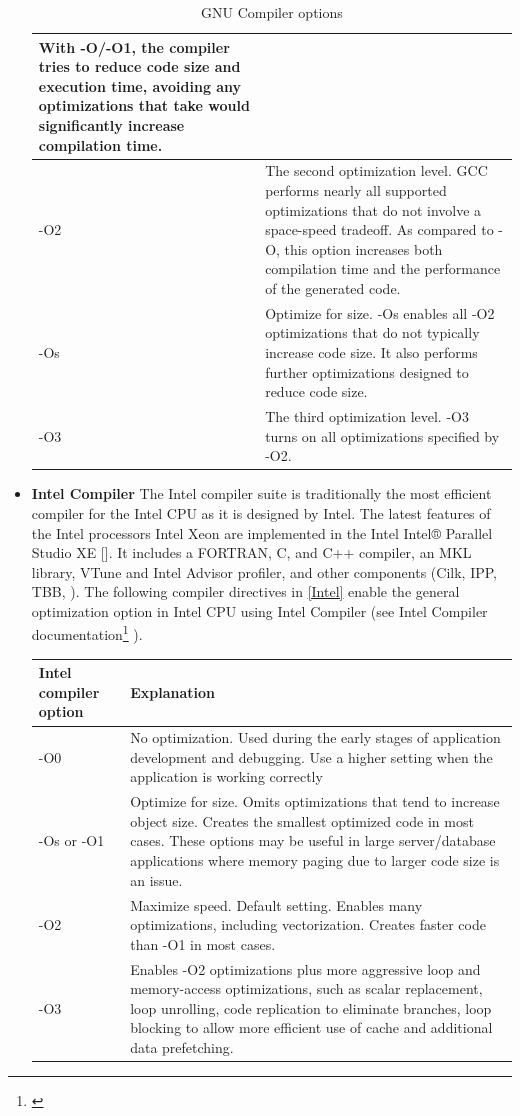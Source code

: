 \begin{itemize}
\begin{table}[!h]
\begin{tabularx}{\linewidth}{|X|X|}
With -O/-O1, the compiler tries to reduce code size and execution time, avoiding any optimizations that take would significantly increase compilation time. \\
\hline
-O2 &  The second optimization level. GCC performs nearly all supported optimizations that do not involve a space-speed tradeoff. As compared to -O, this option increases both compilation time and the performance of the generated code. \\
\hline
-Os & Optimize for size. -Os enables all -O2 optimizations that do not typically increase code size. It also performs further optimizations designed to reduce code size. \\
\hline
-O3 & The third optimization level. -O3 turns on all optimizations specified by -O2. \\
\hline
\end{tabularx}
\caption{\label{GCC} GNU Compiler options}
\end{table} 

\item \textbf{Intel Compiler}
The Intel compiler suite is traditionally the most efficient compiler for the Intel CPU as it is designed by Intel. The latest features of the Intel processors Intel Xeon are implemented in the Intel Intel® Parallel Studio XE []. It includes a FORTRAN, C, and C++ compiler, an MKL library, VTune and Intel Advisor profiler, and other components (Cilk, IPP, TBB, ). The following compiler directives in \ref{Intel} enable the general optimization option in Intel CPU using Intel Compiler (see Intel Compiler documentation\footnote{\cite{https://software.intel.com/en-us/intel-cplusplus-compiler-17.0-user-and-reference-guide}} ).

\begin{table}[!h]
\centering
\begin{tabularx}{\linewidth}{|X|X|}
\hline
\textbf{Intel compiler option} & \textbf{Explanation} \\
\hline
\hline
-O0 & No optimization. Used during the early stages of application
development and debugging. Use a higher setting when the
application is working correctly \\
\hline 
-Os or -O1 & Optimize for size. Omits optimizations that tend to increase object
size. Creates the smallest optimized code in most cases.
These options may be useful in large server/database applications
where memory paging due to larger code size is an issue. \\
\hline 
-O2 & Maximize speed. Default setting. Enables many optimizations, including
vectorization. Creates faster code than -O1 in most cases. \\
\hline 
-O3  & Enables -O2 optimizations plus more aggressive loop and
memory-access optimizations, such as scalar replacement, loop
unrolling, code replication to eliminate branches, loop blocking to
allow more efficient use of cache and additional data prefetching.


\end{tabularx}
\end{table}
\end{itemize}
